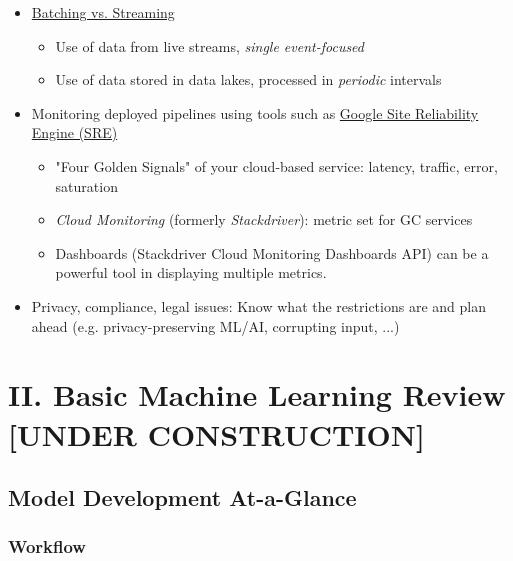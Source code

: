 \documentclass[10pt,landscape,letterpaper]{cheatsheet}
\begin{document}
\begin{multicols}{3}
\begin{itemize}
    \item \href{https://medium.com/simpl-under-the-hood/data-pipeline-batch-vs-stream-processing-d038bdb29e18}{Batching vs. Streaming}
        \begin{itemize}
            \item Use of data from live streams, \textit{single event-focused}
            \item Use of data stored in data lakes, processed in \textit{periodic} intervals
        \end{itemize}
    \item Monitoring deployed pipelines using tools such as \href{https://cloud.google.com/blog/products/management-tools/the-right-metrics-to-monitor-cloud-data-pipelines}{Google Site Reliability Engine (SRE)}
    \begin{itemize}
        \item "Four Golden Signals" of your cloud-based service: latency, traffic, error, saturation
        \item \emph{Cloud Monitoring} (formerly \emph{Stackdriver}): metric set for GC services
        \item Dashboards (Stackdriver Cloud Monitoring Dashboards API) can be a powerful tool in displaying multiple metrics.
    \end{itemize}
    \item Privacy, compliance, legal issues: Know what the restrictions are and plan ahead (e.g. privacy-preserving ML/AI, corrupting input, ...)
\end{itemize}

% 
\section{II. Basic Machine Learning Review [UNDER CONSTRUCTION]}

\subsection{Model Development At-a-Glance}

\subsubsection{Workflow}


\end{multicols}
\end{document}
